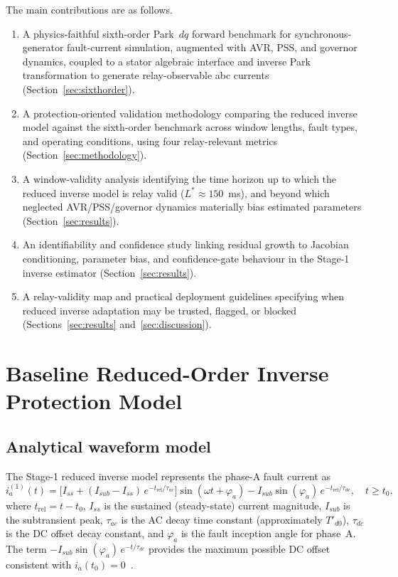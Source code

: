 \documentclass[journal,twoside,letterpaper]{IEEEtran}
\begin{document}
The main contributions are as follows.
\begin{enumerate}
  \item A physics-faithful sixth-order Park~$dq$ forward
    benchmark for synchronous-generator fault-current
    simulation, augmented with AVR, PSS, and governor
    dynamics, coupled to a stator algebraic interface and
    inverse Park transformation to generate relay-observable
    abc currents (Section~\ref{sec:sixthorder}).
  \item A protection-oriented validation methodology
    comparing the reduced inverse model against the
    sixth-order benchmark across window lengths, fault types,
    and operating conditions, using four
    relay-relevant metrics (Section~\ref{sec:methodology}).
  \item A window-validity analysis identifying the time
    horizon up to which the reduced inverse model is relay
    valid ($L^\ast \approx 150$~ms), and beyond which
    neglected AVR/PSS/governor dynamics materially bias
    estimated parameters (Section~\ref{sec:results}).
  \item An identifiability and confidence study linking
    residual growth to Jacobian conditioning, parameter bias,
    and confidence-gate behaviour in the Stage-1 inverse
    estimator (Section~\ref{sec:results}).
  \item A relay-validity map and practical deployment
    guidelines specifying when reduced inverse adaptation
    may be trusted, flagged, or blocked
    (Sections~\ref{sec:results} and~\ref{sec:discussion}).
\end{enumerate}

\section{Baseline Reduced-Order Inverse Protection Model}
\label{sec:baseline}

\subsection{Analytical waveform model}

The Stage-1 reduced inverse model represents the phase-A
fault current as~\cite{Eluvathingal2025_TR01}
\begin{equation}
  i_a^{(1)}(t) = \bigl[I_{ss} + (I_{sub} - I_{ss})\,
                  e^{-t_{\mathrm{rel}}/\tau_{ac}}\bigr]
                  \sin(\omega t + \varphi_a)
                - I_{sub}\sin(\varphi_a)\,
                  e^{-t_{\mathrm{rel}}/\tau_{dc}},
  \quad t \geq t_0,
\label{eq:reduced_model}
\end{equation}
where $t_{\mathrm{rel}} = t - t_0$, $I_{ss}$ is the sustained
(steady-state) current magnitude, $I_{sub}$ is the subtransient
peak, $\tau_{ac}$ is the AC decay time constant (approximately
$T'_{d0}$), $\tau_{dc}$ is the DC offset decay constant, and
$\varphi_a$ is the fault inception angle for phase~A.
The term $-I_{sub}\sin(\varphi_a)\,e^{-t/\tau_{dc}}$ provides
the maximum possible DC offset consistent with
$i_a(t_0) = 0$~\cite{Anderson1977}.
\end{document}

